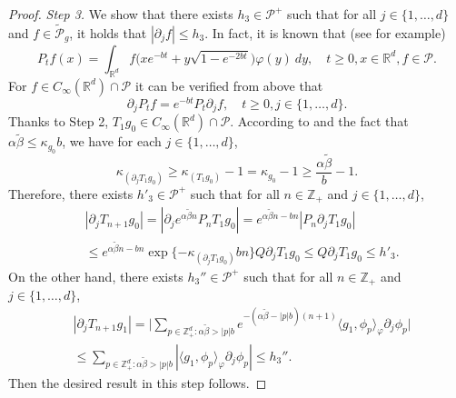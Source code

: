 \documentclass[EJP]{ejpecp} %
\begin{document}
\begin{proof}
	\emph{Step 3.} We show that there exists $h_3 \in \mathcal P^+$ such that for all $j \in \{1,\dots, d\}$ and $f \in \widetilde {\mathcal P}_g$, it holds that $|\partial_j f| \leq h_3$.
	In fact, it is known that  (see \cite{MetafunePallaraPriola2002Spectrum} for example)
\begin{equation}
    \label{eq:P:R:3:-1}
    P_t f(x)
    = \int_{\mathbb R^d} f\big(x e^{-bt} + y \sqrt{1-e^{-2bt}}\big) \varphi(y)~dy,
    \quad t\geq 0, x\in \mathbb R^d, f\in \mathcal P.
\end{equation}
	For $f \in C_\infty(\mathbb R^d)\cap \mathcal P$ it can be verified from above that
\begin{equation}
\label{eq:P:R:3:1}
   \partial_j P_t f
   = e^{-bt} P_t \partial_j f,
   \quad t \geq 0, j \in \{1,\dots, d\}.
\end{equation}
	Thanks to Step 2, $T_1 g_0 \in C_\infty(\mathbb R^d)\cap \mathcal P$.
	According to \cite[Fact 1.3]{MarksMilos2018CLT} and the fact that $\alpha \tilde \beta \leq \kappa _{g_0} b$, we have for each $j \in \{1,\dots, d\}$,
\[
    \kappa_{(\partial_j T_1 g_0)}
    \geq \kappa_{(T_1 g_0)} - 1
    = \kappa_{g_0} - 1
    \geq \frac{\alpha \tilde \beta}{b} - 1.
\]
	Therefore, there exists  $h'_3\in \mathcal P^+$ such that for all $n \in \mathbb Z_+$ and $j\in \{1,\dots,d\}$,
\begin{align}
    & | \partial_j T_{n+1}g_0 |
    = | \partial_j e^{\alpha \tilde \beta n}P_n T_1g_0 |
    = e^{\alpha \tilde \beta n-bn} |P_n \partial_j T_1 g_0| \\
    & \leq e^{\alpha \tilde \beta n-bn} \exp\{-\kappa_{(\partial_j T_1 g_0)}bn\}Q \partial_j T_1g_0
    \leq Q\partial_j T_1g_0
    \leq h'_3.
\end{align}
	On the other hand, there exists $h_3''\in \mathcal P^+$ such that for all $n \in \mathbb Z_+$ and $j\in \{1,\dots,d\}$,
\begin{align}
	& |\partial_j T_{n+1}g_1 |
	= \Big| \sum_{p\in \mathbb Z_+^d: \alpha \tilde \beta > |p|b} e^{- (\alpha \tilde \beta - |p|b)(n+1)} \langle g_1, \phi_p \rangle_\varphi \partial_j \phi_p \Big| \\
	& \leq \sum_{p\in \mathbb Z_+^d: \alpha \tilde \beta > |p|b} |\langle g_1, \phi_p \rangle_\varphi \partial_j \phi_p |
    \leq h_3''.
\end{align}
	Then the desired result in this step follows.


\end{proof}
\end{document}

